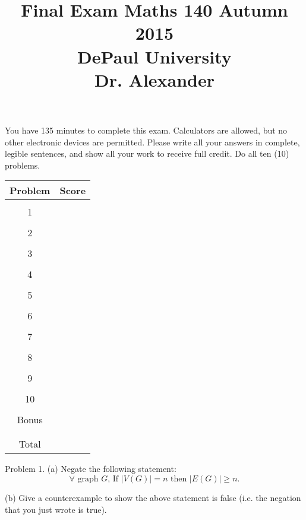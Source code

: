 \documentclass[16 pt]{amsart}
\theoremstyle{definition}
\theoremstyle{remark}
\numberwithin{equation}{subsection}
\begin{document}
\title{Final Exam  Maths 140 Autumn 2015 \\ DePaul University\\Dr. Alexander}
\maketitle
You have 135 minutes to complete this exam.  Calculators are allowed, but no other electronic devices are permitted.  Please write all your answers in complete, legible sentences, and show all your work to receive full credit.  Do all ten (10) problems.
\vspace{1in}


\begin{center}
  \begin{tabular}{ c | c }
    Problem & Score\\
    \hline
    &\\
    1&\\
    &\\
    2&\\
    &\\
    3&\\
    &\\
    4&\\
    &\\
    5&\\
    &\\
    6&\\
    &\\
    7&\\
    &\\
    8&\\
    &\\
    9&\\
    &\\
    10&\\
    &\\
    Bonus&\\
    &\\
    \hline 
    &\\    
    Total& 
 \end{tabular}
\end{center}

\newpage 
Problem 1. (a) Negate the following statement:
\[
\forall \text{ graph } G \text{, If } |V(G)| = n \text{ then } |E(G)| \ge n.
\]

\vspace{1in} 

(b) Give a counterexample to show the above statement is false (i.e. the negation that you just wrote is true).
\end{document}
